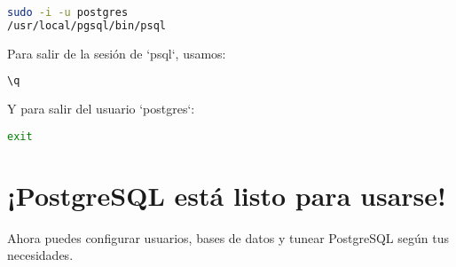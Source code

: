 \documentclass{article}
\begin{document}
\begin{lstlisting}[language=bash]
sudo -i -u postgres
/usr/local/pgsql/bin/psql
\end{lstlisting}

Para salir de la sesión de `psql`, usamos:

\begin{lstlisting}[language=sql]
\q
\end{lstlisting}

Y para salir del usuario `postgres`:

\begin{lstlisting}[language=bash]
exit
\end{lstlisting}

\section{¡PostgreSQL está listo para usarse!}
Ahora puedes configurar usuarios, bases de datos y tunear PostgreSQL según tus necesidades.
\end{document}
